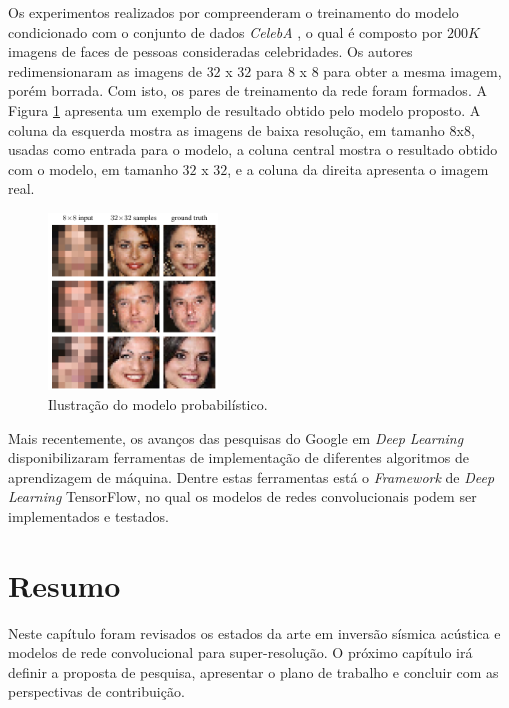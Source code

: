 Os experimentos realizados por \cite{DahlNS17} compreenderam o treinamento do modelo condicionado
com o conjunto de dados \textit{CelebA} \citep{liu15}, o qual é composto por $200K$ imagens de
faces de pessoas consideradas celebridades. Os autores redimensionaram as imagens de
$32$ x $32$ para $8$ x $8$ para obter a mesma imagem, porém borrada. Com isto, os
pares de treinamento da rede foram formados. A Figura \ref{fig:example1} apresenta um exemplo
de resultado obtido pelo modelo proposto. A coluna da esquerda mostra as imagens de baixa
resolução, em tamanho $8$x$8$, usadas como entrada para o modelo, a coluna central mostra o
resultado obtido com o modelo, em tamanho $32$ x $32$, e a coluna da direita apresenta o imagem
real.
\begin{figure}[ht!]
\begin{center}
  \includegraphics[width=0.4\textwidth]{fig/example_superres_1}
  \caption{Ilustração do modelo probabilístico. \citep{DahlNS17}}
  \label{fig:example1}
\end{center}
\end{figure}

Mais recentemente, os avanços das pesquisas do Google em \textit{Deep Learning} disponibilizaram
ferramentas de implementação de diferentes algoritmos de aprendizagem de máquina. Dentre estas
ferramentas está o \textit{Framework} de \textit{Deep Learning} TensorFlow, no qual os modelos
de redes convolucionais podem ser implementados e testados.

\section{Resumo}

Neste capítulo foram revisados os estados da arte em inversão sísmica acústica e modelos
de rede convolucional para super-resolução.
O próximo capítulo irá definir a proposta de pesquisa, apresentar o plano de trabalho e concluir com as perspectivas de
contribuição.
